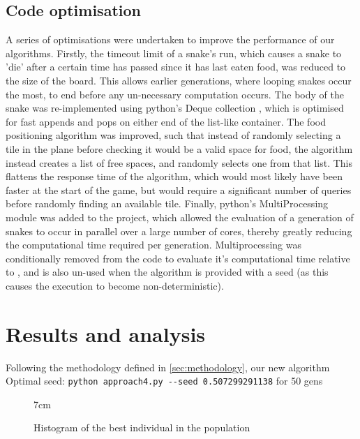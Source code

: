 \documentclass[british,10pt,a4paper]{article}
\begin{document}
\subsection{Code optimisation}
\label{subsec:code_optimisation}
A series of optimisations were undertaken to improve the performance of our algorithms. Firstly, the timeout limit of a snake's run, which causes a snake to 'die' after a certain time has passed since it has last eaten food, was reduced to the size of the board. This allows earlier generations, where looping snakes occur the most, to end before any un-necessary computation occurs. \newline
The body of the snake was re-implemented using python's Deque collection \cite{noauthor_undated-bi}, which is optimised for fast appends and pops on either end of the list-like container. The food positioning algorithm was improved, such that instead of randomly selecting a tile in the plane before checking it would be a valid space for food, the algorithm instead creates a list of free spaces, and randomly selects one from that list. This flattens the response time of the algorithm, which would most likely have been faster at the start of the game, but would require a significant number of queries before randomly finding an available tile. Finally, python's MultiProcessing module was added to the project, which allowed the evaluation of a generation of snakes to occur in parallel over a large number of cores, thereby greatly reducing the computational time required per generation. Multiprocessing was conditionally removed from the code to evaluate it's computational time relative to \citet{Ehlis2000-sz}, and is also un-used when the algorithm is provided with a seed (as this causes the execution to become non-deterministic).

\section{Results and analysis}
Following the methodology defined in \autoref{sec:methodology}, our new algorithm 
Optimal seed: \lstinline{python approach4.py --seed 0.507299291138} for 50 gens

\begin{figure}
\centering
\resizebox {!} {7cm} {
}
\caption{Histogram of the best individual in the population}
\label{fig:approach1_vs_approach4}
\end{figure}
\end{document}
